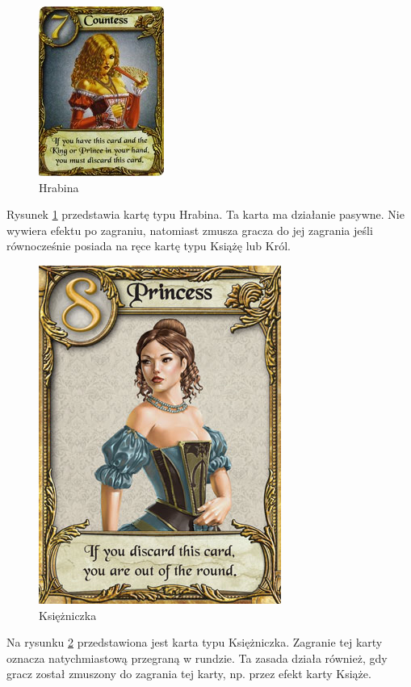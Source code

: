 \clearpage
\begin{figure}[h]
	\centering
	\includegraphics{Resources/Love_Letter_Card_Countess.png}
	\caption{Hrabina} \label{fig:Love_Letter_Card_Countess}
\end{figure}
Rysunek \ref{fig:Love_Letter_Card_Countess} przedstawia kartę typu Hrabina. Ta karta ma działanie pasywne. Nie wywiera efektu po zagraniu, natomiast zmusza gracza do jej zagrania jeśli równocześnie posiada na ręce kartę typu Książę lub Król.

\begin{figure}[h]
	\centering
	\includegraphics[scale=0.5]{Resources/Love_Letter_Card_Princess.png}
	\caption{Księżniczka} \label{fig:Love_Letter_Card_Princess}
\end{figure}
Na rysunku \ref{fig:Love_Letter_Card_Princess} przedstawiona jest karta typu Księżniczka. Zagranie tej karty oznacza natychmiastową przegraną w rundzie. Ta zasada działa również, gdy gracz został zmuszony do zagrania tej karty, np. przez efekt karty Książe.
\clearpage

